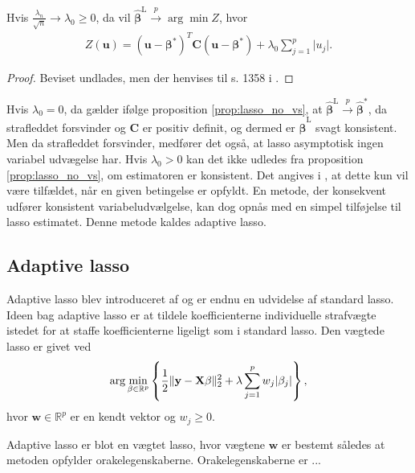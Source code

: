 \begin{prop}\label{prop:lasso_no_vs}
Hvis $\frac{\lambda_n}{\sqrt{n}} \rightarrow \lambda_0 \geq 0$, da vil $\hat{\boldsymbol{\beta}}^\text{L} \overset{p}{\rightarrow} \arg \min Z$, hvor
\begin{align*}
Z(\mathbf{u})=(\mathbf{u}- \boldsymbol{\beta}^*)^T \mathbf{C} (\mathbf{u}-\boldsymbol{\beta}^*)+\lambda_0 \sum_{j=1}^p \vert u_j \vert.
\end{align*}
\end{prop}
\begin{proof}
Beviset undlades, men der henvises til s. 1358 i \citep{adaptive_lasso_knight}.
\end{proof}
Hvis $\lambda_0=0$, da gælder ifølge proposition \ref{prop:lasso_no_vs}, at $\hat{\boldsymbol{\beta}}^\text{L} \overset{p}{\rightarrow} \hat{\boldsymbol{\beta}}^{*}$, da strafleddet forsvinder og $\mathbf{C}$ er positiv definit, og dermed er $\hat{\boldsymbol{\beta}}^\text{L}$ svagt konsistent. Men da strafleddet forsvinder, medfører det også, at lasso asymptotisk ingen variabel udvægelse har. Hvis $\lambda_0>0$ kan det ikke udledes fra proposition \ref{prop:lasso_no_vs}, om estimatoren er konsistent. Det angives i \citep{adaptive_lasso}, at dette kun vil være tilfældet, når en given betingelse er opfyldt. En metode, der konsekvent udfører konsistent variabeludvælgelse, kan dog opnås med en simpel tilføjelse til lasso estimatet. Denne metode kaldes adaptive lasso.


\subsection{Adaptive lasso}
Adaptive lasso blev introduceret af \citep{adaptive_lasso} og er endnu en udvidelse af standard lasso.
Ideen bag adaptive lasso er at tildele koefficienterne individuelle strafvægte istedet for at staffe koefficienterne ligeligt som i standard lasso.
Den vægtede lasso er givet ved
\begin{align*}
\arg \min_{\beta \in \R^p} \cbr{\frac{1}{2} \Vert \y - \X \beta \Vert_2^2 + \lambda \sum_{j=1}^p w_j \vert \beta_j \vert},
\end{align*}
hvor \(\mathbf{w} \in \mathbb{R}^p\) er en kendt vektor og \(w_j \geq 0\).

Adaptive lasso er blot en vægtet lasso, hvor vægtene \(\mathbf{w}\) er bestemt således at metoden opfylder orakelegenskaberne.
Orakelegenskaberne er ...


